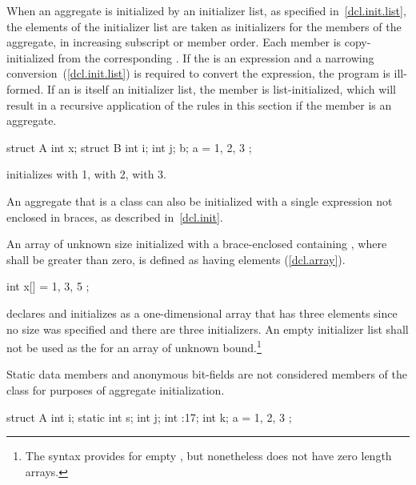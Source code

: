 \pnum
When an aggregate is initialized by an initializer list, as specified in~\ref{dcl.init.list}, the elements of the initializer list are taken as initializers
for the members of the aggregate,
in increasing subscript or member order.
Each member is copy-initialized from the corresponding . If the  is an expression and a narrowing conversion~(\ref{dcl.init.list}) is required to convert the expression, the program is ill-formed. \enternote If an  is itself an initializer list, the member is list-initialized, which will result in a recursive application of the rules in this section if the member is an aggregate. \exitnote
\enterexample
\begin{codeblock}
struct A {
  int x;
  struct B {
    int i;
    int j;
  } b;
} a = { 1, { 2, 3 } };
\end{codeblock}

initializes
with 1,
with 2,
with 3.
\exitexample

\pnum
An aggregate that is a class can also be initialized with a single
expression not enclosed in braces, as described in~\ref{dcl.init}.

\pnum
An array of unknown size initialized with a
brace-enclosed
containing
,
where
shall be greater than zero, is defined as having
elements (\ref{dcl.array}).
\enterexample

\begin{codeblock}
int x[] = { 1, 3, 5 };
\end{codeblock}

declares and initializes
as a one-dimensional array that has three elements
since no size was specified and there are three initializers.
\exitexample
An empty initializer list
\tcode{\{\}}
shall not be used as the 
for an array of unknown bound.\footnote{The syntax provides for empty
,
but nonetheless \Cpp does not have zero length arrays.}

\pnum
Static data members and anonymous bit-fields are not considered
members of the class for purposes of aggregate initialization.
\enterexample

\begin{codeblock}
struct A {
  int i;
  static int s;
  int j;
  int :17;
  int k;
} a = { 1, 2, 3 };
\end{codeblock}

